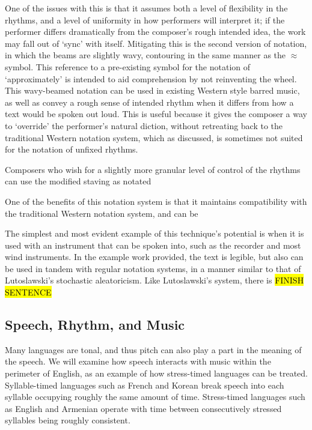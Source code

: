 One of the issues with this is that it assumes both a level of flexibility in the rhythms, and a level of uniformity in how performers will interpret it; if the performer differs dramatically from the composer's rough intended idea, the work may fall out of `sync' with itself.
Mitigating this is the second version of notation, in which the beams are slightly wavy, contouring in the same manner as the \(\approx{}\) symbol. 
This reference to a pre-existing symbol for the notation of `approximately' is intended to aid comprehension by not reinventing the wheel.
This wavy-beamed notation can be used in existing Western style barred music, as well as convey a rough sense of intended rhythm when it differs from how a text would be spoken out loud.
This is useful because it gives the composer a way to `override' the performer's natural diction, without retreating back to the traditional Western notation system, which as discussed, is sometimes not suited for the notation of unfixed rhythms.

Composers who wish for a slightly more granular level of control of the rhythms can use the modified staving as notated 

One of the benefits of this notation system is that it maintains compatibility with the traditional Western notation system, and can be 

The simplest and most evident example of this technique's potential is when it is used with an instrument that can be spoken into, such as the recorder and most wind instruments. 
In the example work provided, the text is legible, but also can be used in tandem with regular notation systems, in a manner similar to that of Lutoslawski's stochastic aleatoricism.
Like Lutoslawski's system, there is \hl{FINISH SENTENCE}

\subsection{Speech, Rhythm, and Music}
Many languages are tonal, and thus pitch can also play a part in the meaning of the speech. 
We will examine how speech interacts with music within the perimeter of English, as an example of how stress-timed languages can be treated. 
Syllable-timed languages such as French and Korean break speech into each syllable occupying roughly the same amount of time.\autocite{mokKoreanSpeechRhythm}
Stress-timed languages such as English and Armenian operate with time between consecutively stressed syllables being roughly consistent.\autocite{mirakyanImplicationsProsodicDifferences2016}

